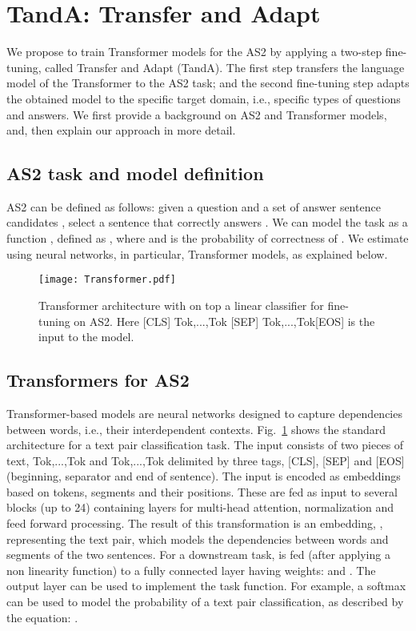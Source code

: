 \documentclass[letterpaper]{article} \usepackage{aaai20}  \usepackage{times}  \usepackage{helvet} \usepackage{courier}  \usepackage[hyphens]{url}  \usepackage{graphicx} \urlstyle{rm} \def\UrlFont{\rm}  \usepackage{graphicx}  \usepackage{todonotes}
\newcommand{\TANDA}{T{\sc and}A}
\begin{document}
\section{{\TANDA}: Transfer and Adapt}
\label{tanda}

We propose to train Transformer models for the AS2 by applying a two-step fine-tuning, called Transfer {\sc and} Adapt ({\TANDA}). The first step transfers the language model of the Transformer to the AS2 task; and the second fine-tuning step adapts the obtained model to the specific target domain, i.e., specific types of questions and answers. We first provide a background on AS2 and Transformer models, and, then explain our approach in more detail.

\subsection{AS2 task and model definition}
AS2 can be defined as follows: given a question  and a set of answer sentence candidates , select a sentence  that correctly answers .
We can model the task as a function , defined as , where  and  is the probability of correctness of . We estimate  using neural networks, in particular, Transformer models, as explained below.



 \begin{figure}[h]
   \center
    \texttt{[image: Transformer.pdf]}
\vspace{-.5em}
    \caption{Transformer architecture with on top a linear classifier for fine-tuning on AS2. Here [CLS] Tok,...,Tok [SEP] Tok,...,Tok[EOS] is the input to the model.}
    \label{fig:transformer}
\vspace{-.5em}
\end{figure}

\subsection{Transformers for AS2}



Transformer-based models are neural networks designed to capture dependencies between words, i.e., their interdependent contexts. Fig.~\ref{fig:transformer} shows the standard architecture for a text pair classification task. The input consists of two pieces of text, Tok,...,Tok and Tok,...,Tok delimited by three tags, [CLS], [SEP] and [EOS] (beginning, separator and end of sentence). The input is encoded as embeddings based on tokens, segments and their positions. These are fed as input to several blocks (up to 24) containing layers for multi-head attention, normalization and feed forward processing. The result of this transformation is an embedding, , representing the text pair, which models the dependencies between words and segments of the two sentences.
For a downstream task,  is fed (after applying a non linearity function) to a fully connected layer having weights:  and . The output layer can be used to implement the task function. For example, a softmax can be used to model the probability of a text pair classification, as described by the equation:
. 
\end{document}
